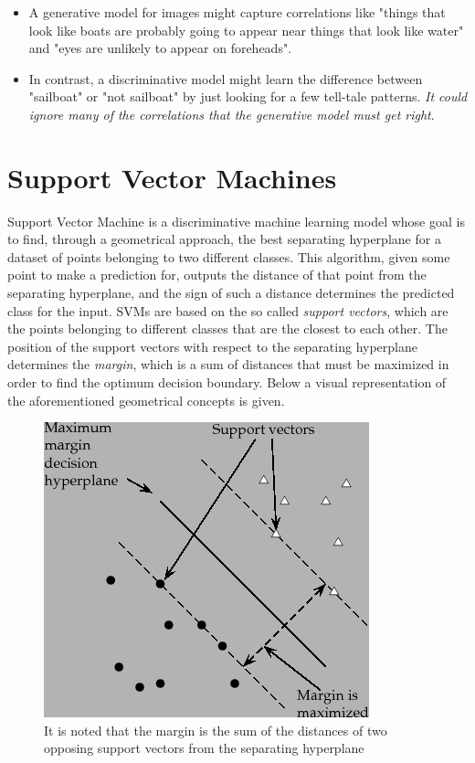 \begin{itemize}
    \item A generative model for images might capture correlations like "things that look like boats are probably going to appear near things that look like water" and "eyes are unlikely to appear on foreheads".

    \item In contrast, a discriminative model might learn the difference between "sailboat" or "not sailboat" by just looking for a few tell-tale patterns. \textit{It could ignore many of the correlations that the generative model must get right}.
\end{itemize}


\break
\section{Support Vector Machines}

Support Vector Machine is a discriminative machine learning model whose goal is to find, through a geometrical approach, the best separating hyperplane for a dataset of points belonging to two different classes. This algorithm, given some point to make a prediction for, outputs the distance of that point from the separating hyperplane, and the sign of such a distance determines the predicted class for the input.
SVMs are based on the so called \textit{support vectors}, which are the points belonging to different classes that are the closest to each other. The position of the support vectors with respect to the separating hyperplane determines the \textit{margin}, which is a sum of distances that must be maximized in order to find the optimum decision boundary. 
Below a visual representation of the aforementioned geometrical concepts is given.

\begin{figure}[h]
    \centering
    \includegraphics[scale=0.75]{images/svm/margin-support-vectors-visual.png}
    \caption{It is noted that the margin is the sum of the distances of two opposing support vectors from the separating hyperplane}
    \label{fig:svm_geom_concepts_visual}
\end{figure}

